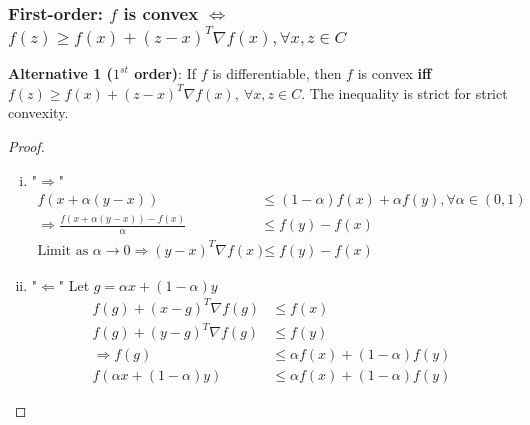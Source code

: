 \documentclass[11pt,a4paper]{article}
\begin{document}
\subsubsection{First-order: $f$ is convex $\Leftrightarrow$ $f(z) \geq f(x)+(z-x)^{T} \nabla f(x), \forall x, z \in C$}
\textbf{Alternative 1 ($1^{st}$ order)}: If $f$ is differentiable, then $f$ is convex \textbf{iff} $f(z) \geq f(x)+(z-x)^{T} \nabla f(x), \ \forall x, z \in C .$ The inequality is strict for strict convexity.
\begin{proof}
\quad
\begin{enumerate}[(i)]
    \item "$\Rightarrow$" \begin{equation}
        \begin{aligned}
            f(x+\alpha (y-x))&\leq (1-\alpha)f(x)+\alpha f(y), \forall \alpha \in (0,1)\\
            \Rightarrow	\frac{f(x+\alpha(y-x))-f(x)}{\alpha}&\leq f(y)-f(x)\\
            \text{Limit as }\alpha \rightarrow 0 \Rightarrow (y-x)^{T} \nabla f(x)&\leq f(y)-f(x)
        \end{aligned}
        \nonumber
    \end{equation}
    \item "$\Leftarrow$" Let $g=\alpha x+(1-\alpha) y$
    \begin{equation}
        \begin{aligned}
            f(g)+(x-g)^{T} \nabla f(g)&\leq f(x)\\
            f(g)+(y-g)^{T} \nabla f(g)&\leq f(y)\\
            \Rightarrow	f(g)&\leq \alpha f(x)+(1-\alpha)f(y)\\
            f(\alpha x+(1-\alpha) y)&\leq \alpha f(x)+(1-\alpha)f(y)
        \end{aligned}
        \nonumber
    \end{equation}
\end{enumerate}
\end{proof}
\end{document}
